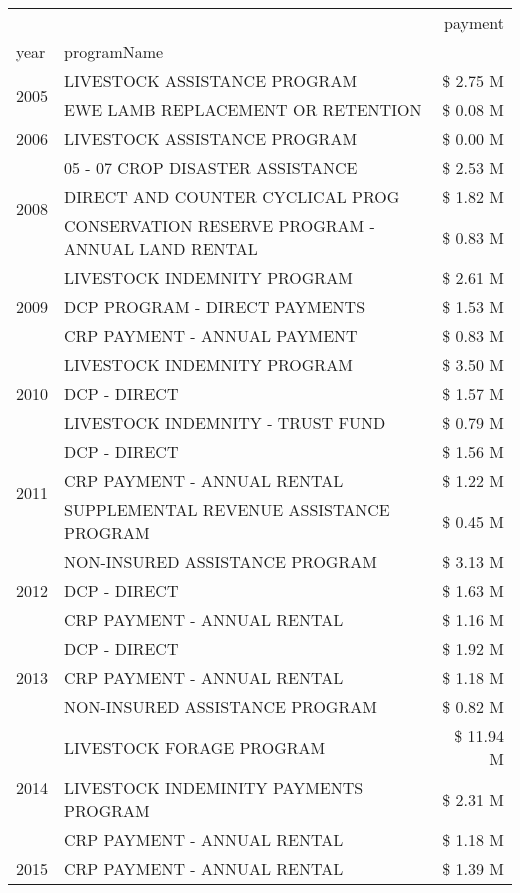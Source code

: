 \begin{tabular}{llr}
\toprule
 &  & payment \\
year & programName &  \\
\midrule
\multirow[t]{2}{*}{2005} & LIVESTOCK ASSISTANCE PROGRAM & \$ 2.75 M \\
 & EWE LAMB REPLACEMENT OR RETENTION & \$ 0.08 M \\
\cline{1-3}
2006 & LIVESTOCK ASSISTANCE PROGRAM & \$ 0.00 M \\
\cline{1-3}
\multirow[t]{3}{*}{2008} & 05 - 07 CROP DISASTER ASSISTANCE & \$ 2.53 M \\
 & DIRECT AND COUNTER CYCLICAL PROG & \$ 1.82 M \\
 & CONSERVATION RESERVE PROGRAM - ANNUAL LAND RENTAL & \$ 0.83 M \\
\cline{1-3}
\multirow[t]{3}{*}{2009} & LIVESTOCK INDEMNITY PROGRAM & \$ 2.61 M \\
 & DCP PROGRAM - DIRECT PAYMENTS & \$ 1.53 M \\
 & CRP PAYMENT - ANNUAL PAYMENT & \$ 0.83 M \\
\cline{1-3}
\multirow[t]{3}{*}{2010} & LIVESTOCK INDEMNITY PROGRAM & \$ 3.50 M \\
 & DCP - DIRECT & \$ 1.57 M \\
 & LIVESTOCK INDEMNITY - TRUST FUND & \$ 0.79 M \\
\cline{1-3}
\multirow[t]{3}{*}{2011} & DCP - DIRECT & \$ 1.56 M \\
 & CRP PAYMENT - ANNUAL RENTAL & \$ 1.22 M \\
 & SUPPLEMENTAL REVENUE ASSISTANCE PROGRAM & \$ 0.45 M \\
\cline{1-3}
\multirow[t]{3}{*}{2012} & NON-INSURED ASSISTANCE PROGRAM & \$ 3.13 M \\
 & DCP - DIRECT & \$ 1.63 M \\
 & CRP PAYMENT - ANNUAL RENTAL & \$ 1.16 M \\
\cline{1-3}
\multirow[t]{3}{*}{2013} & DCP - DIRECT & \$ 1.92 M \\
 & CRP PAYMENT - ANNUAL RENTAL & \$ 1.18 M \\
 & NON-INSURED ASSISTANCE PROGRAM & \$ 0.82 M \\
\cline{1-3}
\multirow[t]{3}{*}{2014} & LIVESTOCK FORAGE PROGRAM & \$ 11.94 M \\
 & LIVESTOCK INDEMINITY PAYMENTS PROGRAM & \$ 2.31 M \\
 & CRP PAYMENT - ANNUAL RENTAL & \$ 1.18 M \\
\cline{1-3}
\multirow[t]{3}{*}{2015} & CRP PAYMENT - ANNUAL RENTAL & \$ 1.39 M \\

\end{tabular}

